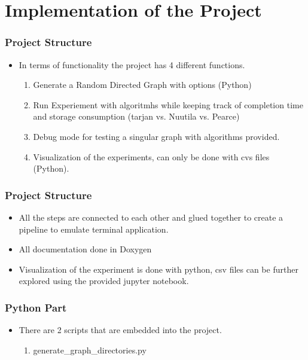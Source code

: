 \documentclass{beamer}
\begin{document}
	\section{Implementation of the Project}
		\begin{frame}
			\frametitle{Project Structure}
			\begin{itemize}
				\item <1-> In terms of functionality the project has 4 different functions.
				\begin{enumerate}
					\item <2-> Generate a Random Directed Graph with options (Python)
					\item <3-> Run Experiement with algoritmhs while keeping track of completion time and storage consumption (tarjan vs. Nuutila vs. Pearce)
					\item <4-> Debug mode for testing a singular graph with algorithms provided.
					\item <5-> Visualization of the experiments, can only be done with cvs files (Python).
				\end{enumerate}
			\end{itemize}
		\end{frame}
		\begin{frame}
			\frametitle{Project Structure}
			\begin{itemize}
				\item <1-> All the steps are connected to each other and glued together to create a pipeline to emulate terminal application.
				\item <2-> All documentation done in Doxygen
				\item <3-> Visualization of the experiment is done with python, csv files can be further explored using the provided jupyter notebook.
			\end{itemize}
		\end{frame}
		\begin{frame}
			\frametitle{Python Part}
			\begin{itemize}
				\item <1-> There are 2 scripts that are embedded into the project.
				\begin{enumerate}
					\item <1-> generate_graph_directories.py
				\end{enumerate} 
			\end{itemize}
		\end{frame}
\end{document}
